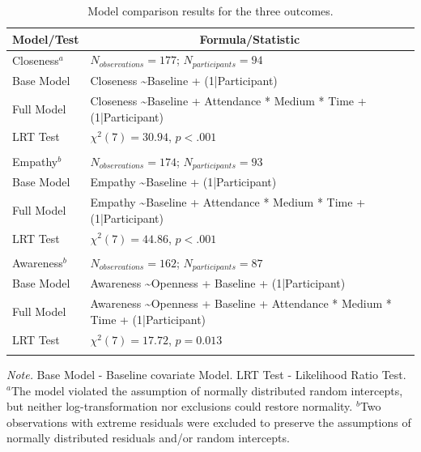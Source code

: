 \documentclass[
  man,floatsintext]{apa6}
\begin{document}
\begin{table}[tbp]

\begin{center}
\begin{threeparttable}

\caption{\label{tab:model-comp}Model comparison results for the three outcomes.}

\begin{tabular}{ll}
\toprule
Model/Test & \multicolumn{1}{c}{Formula/Statistic}\\
\midrule
Closeness$^a$ & $N_{observations} = 177$; $N_{participants} = 94$\\
Base Model & Closeness \textasciitilde Baseline + (1|Participant)\\
Full Model & Closeness \textasciitilde Baseline + Attendance * Medium * Time + (1|Participant)\\
LRT Test & $\chi^2 (7) = 30.94$, $p < .001$\\
 & \\
Empathy$^b$ & $N_{observations} = 174$; $N_{participants} = 93$\\
Base Model & Empathy \textasciitilde Baseline + (1|Participant)\\
Full Model & Empathy \textasciitilde Baseline + Attendance * Medium * Time + (1|Participant)\\
LRT Test & $\chi^2 (7) = 44.86$, $p < .001$\\
 & \\
Awareness$^b$ & $N_{observations} = 162$; $N_{participants} = 87$\\
Base Model & Awareness \textasciitilde Openness + Baseline + (1|Participant)\\
Full Model & Awareness \textasciitilde Openness + Baseline + Attendance * Medium * Time + (1|Participant)\\
LRT Test & $\chi^2 (7) = 17.72$, $p = 0.013$\\
\bottomrule
\addlinespace
\end{tabular}

\begin{tablenotes}[para]
\normalsize{\textit{Note.} Base Model - Baseline covariate Model. LRT Test - Likelihood Ratio Test. $^a$The model violated the assumption of normally distributed random intercepts, but neither log-transformation nor exclusions could restore normality. $^b$Two observations with extreme residuals were excluded to preserve the assumptions of normally distributed residuals and/or random intercepts.}
\end{tablenotes}

\end{threeparttable}
\end{center}

\end{table}
\end{document}
